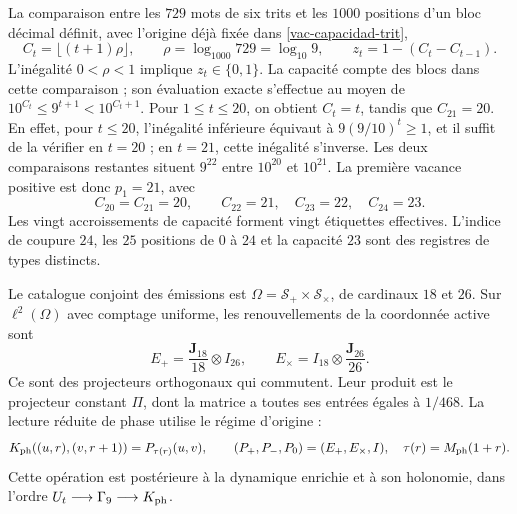 La comparaison entre les $729$ mots de six trits et les $1000$
positions d’un bloc décimal définit, avec l’origine déjà fixée dans
\ref{vac-capacidad-trit},
\begin{equation}
 C_t=\lfloor(t+1)\rho\rfloor,
 \qquad \rho=\log_{1000}729=\log_{10}9,
 \qquad z_t=1-(C_t-C_{t-1}).
 \label{eq:ii-ter27-capacidad}
\end{equation}
L’inégalité $0<\rho<1$ implique $z_t\in\{0,1\}$. La capacité compte
des blocs dans cette comparaison ; son évaluation exacte s’effectue au moyen de
$10^{C_t}\leq9^{t+1}<10^{C_t+1}$. Pour $1\leq t\leq20$, on obtient
$C_t=t$, tandis que $C_{21}=20$. En effet, pour $t\leq20$, l’inégalité
inférieure équivaut à $9(9/10)^t\geq1$, et il suffit de la vérifier en $t=20$ ;
en $t=21$, cette inégalité s’inverse. Les deux comparaisons restantes
situent $9^{22}$ entre $10^{20}$ et $10^{21}$. La première vacance positive
est donc $p_1=21$, avec
\[
 C_{20}=C_{21}=20,\qquad C_{22}=21,\quad C_{23}=22,\quad C_{24}=23.
\]
Les vingt accroissements de capacité forment vingt étiquettes effectives.
L’indice de coupure $24$, les $25$ positions de $0$ à $24$ et la capacité
$23$ sont des registres de types distincts.

Le catalogue conjoint des émissions est
$\Omega=\mathcal S_+\times\mathcal S_\times$, de cardinaux $18$ et
$26$. Sur $\ell^2(\Omega)$ avec comptage uniforme, les renouvellements de
la coordonnée active sont
\[
 E_+=\frac{\mathbf J_{18}}{18}\otimes I_{26},\qquad
 E_\times=I_{18}\otimes\frac{\mathbf J_{26}}{26}.
\]
Ce sont des projecteurs orthogonaux qui commutent. Leur produit est le projecteur
constant $\Pi$, dont la matrice a toutes ses entrées égales à $1/468$.
La lecture réduite de phase utilise le régime d’origine :
\[
 K_{\rm ph}((u,r),(v,r+1))=P_{\tau(r)}(u,v),
 \qquad (P_+,P_-,P_0)=(E_+,E_\times,I),
 \quad \tau(r)=M_{\rm ph}(1+r).
\]
Cette opération est postérieure à la dynamique enrichie et à son holonomie,
dans l’ordre $U_t\longrightarrow\Gamma_9\longrightarrow K_{\rm ph}$.

